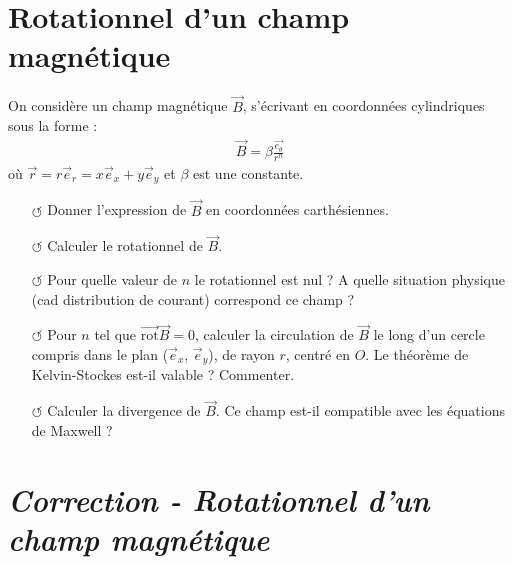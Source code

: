 \documentclass{report}
\begin{document}
\newpage

\section*{Rotationnel d'un champ magnétique}

On considère un champ magnétique $\vec{B}$, s'écrivant en coordonnées cylindriques sous la forme :
\begin{align*}
  \vec{B}=\beta\frac{\vec{e_\theta}}{r^{n}}
\end{align*}
où $\vec{r}=r\vec{e}_r=x\vec{e}_x+y\vec{e}_y$ et $\beta$ est une constante.
\begin{itemize}

	\item[$\circlearrowleft$] Donner l'expression de $\vec{B}$ en coordonnées carthésiennes. 

	\item[$\circlearrowleft$] Calculer le rotationnel de $\vec{B}$.
	
	\item[$\circlearrowleft$] Pour quelle valeur de $n$ le rotationnel est nul ? A quelle situation physique (cad distribution de courant) correspond ce champ ? 
	
	\item[$\circlearrowleft$] Pour $n$ tel que $\vec{\mathrm{rot}}\vec{B}=0$, calculer la circulation de $\vec{B}$ le long d'un cercle compris dans le plan ($\vec{e}_x$, $\vec{e}_y$), de rayon $r$, centré en $O$. Le théorème de Kelvin-Stockes est-il valable ? Commenter.
	
	\item[$\circlearrowleft$] Calculer la divergence de $\vec{B}$. Ce champ est-il compatible avec les équations de Maxwell ?

\end{itemize}

\newpage

\section*{\textit{Correction - Rotationnel d'un champ magnétique}}
\end{document}
